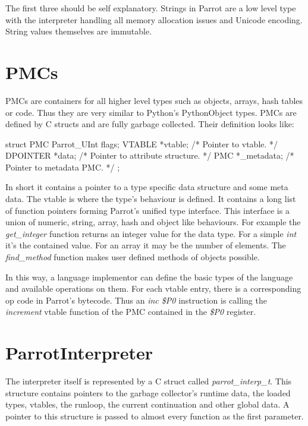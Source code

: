 \documentclass[bachelor,english]{hgbthesis}
\begin{document}
The first three should be self explanatory. Strings in Parrot are a low level type with the interpreter handling all memory allocation issues and Unicode encoding. String values themselves are immutable.

\section{PMCs}

PMCs are containers for all higher level types such as objects, arrays, hash tables or code. Thus they are very similar to Python's PythonObject types. PMCs are defined by C structs and are fully garbage collected. Their definition looks like:
\begin{CCode}
struct PMC {
    Parrot_UInt    flags;
    VTABLE         *vtable;             /* Pointer to vtable. */
    DPOINTER       *data;               /* Pointer to attribute structure. */
    PMC            *_metadata;          /* Pointer to metadata PMC. */
};
\end{CCode}
In short it contains a pointer to a type specific data structure and some meta data. The vtable is where the type's behaviour is defined. It contains a long list of function pointers forming Parrot's unified type interface. This interface is a union of numeric, string, array, hash and object like behaviours. For example the  \textit{get\_integer} function returns an integer value for the data type. For a simple \textit{int} it's the contained value. For an array it may be the number of elements. The \textit{find\_method} function makes user defined methods of objects possible.

In this way, a language implementor can define the basic types of the language and available operations on them. For each vtable entry, there is a corresponding op code in Parrot's bytecode. Thus an \textit{inc \$P0} instruction is calling the \textit{increment} vtable function of the PMC contained in the \textit{\$P0} register.

\section{ParrotInterpreter}

The interpreter itself is represented by a C struct called \textit{parrot\_interp\_t}. This structure contains pointers to the garbage collector's runtime data, the loaded types, vtables, the runloop, the current continuation and other global data. A pointer to this structure is passed to almost every function as the first parameter.
\end{document}
